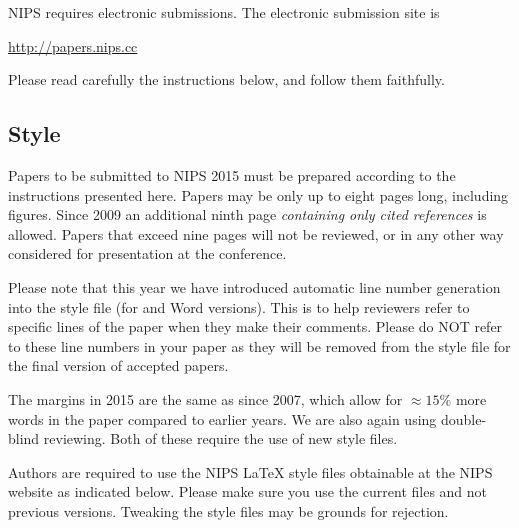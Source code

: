 \documentclass{article} %
\begin{document}
\iffalse 


NIPS requires electronic submissions.  The electronic submission site is  
\begin{center}
   \url{http://papers.nips.cc}
\end{center}

Please read carefully the
instructions below, and follow them faithfully.
\subsection{Style}

Papers to be submitted to NIPS 2015 must be prepared according to the
instructions presented here. Papers may be only up to eight pages long,
including figures. Since 2009 an additional ninth page \textit{containing only
cited references} is allowed. Papers that exceed nine pages will not be
reviewed, or in any other way considered for presentation at the conference.

Please note that this year we have introduced automatic line number generation
into the style file (for \LaTeXe and Word versions). This is to help reviewers
refer to specific lines of the paper when they make their comments. Please do
NOT refer to these line numbers in your paper as they will be removed from the
style file for the final version of accepted papers.

The margins in 2015 are the same as since 2007, which allow for $\approx 15\%$
more words in the paper compared to earlier years. We are also again using 
double-blind reviewing. Both of these require the use of new style files.

Authors are required to use the NIPS \LaTeX{} style files obtainable at the
NIPS website as indicated below. Please make sure you use the current files and
not previous versions. Tweaking the style files may be grounds for rejection.


\end{document}
